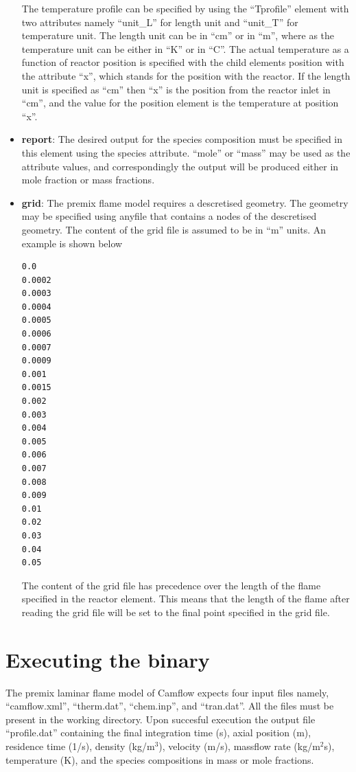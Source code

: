 \begin{itemize}
The temperature profile can be specified by using the ``Tprofile'' element with two attributes namely ``unit\_L'' for length unit and ``unit\_T'' for temperature unit. The length unit can be in ``cm'' or in ``m'', where as the temperature unit can be either in ``K'' or in ``C''. The actual temperature as a function of reactor position is specified with the child elements position with the attribute ``x'', which stands for the position with the reactor. If the length unit is specified as ``cm'' then ``x'' is the position from the reactor inlet in ``cm'', and the value for the position element is the temperature at position ``x''.

\item \textbf{report}: The desired output for the species composition must be specified in this element using the species attribute. ``mole'' or ``mass'' may be used as the attribute values, and correspondingly the output will be produced either in mole fraction or mass fractions.

\item \textbf{grid}: The premix flame model requires a descretised geometry. The geometry may be specified using anyfile that contains a nodes of the descretised geometry. The content of the grid file is assumed to be in ``m'' units. An example is shown below\\
{\scriptsize{\begin{verbatim}
0.0
0.0002
0.0003
0.0004
0.0005
0.0006
0.0007
0.0009
0.001
0.0015
0.002
0.003
0.004
0.005
0.006
0.007
0.008
0.009
0.01
0.02
0.03
0.04
0.05
\end{verbatim}
}}

The content of the grid file has precedence over the length of the flame specified in the reactor element. This means that the length of the flame after reading the grid file will be set to the final point specified in the grid file.
\end{itemize}

\section{Executing the binary}
The premix laminar flame model of Camflow expects four input files namely, ``camflow.xml'', ``therm.dat'',  ``chem.inp'', and ``tran.dat''. All the files must be present in the working directory. Upon succesful execution the output file ``profile.dat'' containing the final integration time (s), axial position (m), residence time (1/s), density (kg/m$^3$), velocity (m/s), massflow rate (kg/m$^2$s), temperature (K), and the species compositions in mass or mole fractions.

